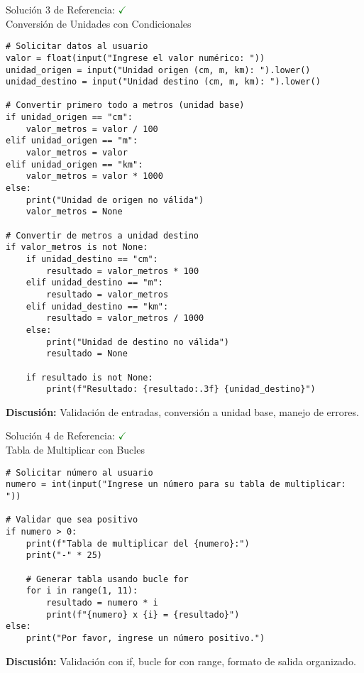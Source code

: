 \documentclass[10pt]{beamer}
\begin{document}
\begin{frame}[fragile]{Solución 3 de Referencia: \hfill \textcolor{green}{$\checkmark$} \\ Conversión de Unidades con Condicionales}
\begin{verbatim}
# Solicitar datos al usuario
valor = float(input("Ingrese el valor numérico: "))
unidad_origen = input("Unidad origen (cm, m, km): ").lower()
unidad_destino = input("Unidad destino (cm, m, km): ").lower()

# Convertir primero todo a metros (unidad base)
if unidad_origen == "cm":
    valor_metros = valor / 100
elif unidad_origen == "m":
    valor_metros = valor
elif unidad_origen == "km":
    valor_metros = valor * 1000
else:
    print("Unidad de origen no válida")
    valor_metros = None

# Convertir de metros a unidad destino
if valor_metros is not None:
    if unidad_destino == "cm":
        resultado = valor_metros * 100
    elif unidad_destino == "m":
        resultado = valor_metros
    elif unidad_destino == "km":
        resultado = valor_metros / 1000
    else:
        print("Unidad de destino no válida")
        resultado = None
    
    if resultado is not None:
        print(f"Resultado: {resultado:.3f} {unidad_destino}")
\end{verbatim}
\textbf{Discusión:} Validación de entradas, conversión a unidad base, manejo de errores.
\end{frame}

\begin{frame}[fragile]{Solución 4 de Referencia: \hfill \textcolor{green}{$\checkmark$} \\ Tabla de Multiplicar con Bucles}
\begin{verbatim}
# Solicitar número al usuario
numero = int(input("Ingrese un número para su tabla de multiplicar: "))

# Validar que sea positivo
if numero > 0:
    print(f"Tabla de multiplicar del {numero}:")
    print("-" * 25)
    
    # Generar tabla usando bucle for
    for i in range(1, 11):
        resultado = numero * i
        print(f"{numero} x {i} = {resultado}")
else:
    print("Por favor, ingrese un número positivo.")
\end{verbatim}
\textbf{Discusión:} Validación con if, bucle for con range, formato de salida organizado.
\end{frame}
\end{document}
